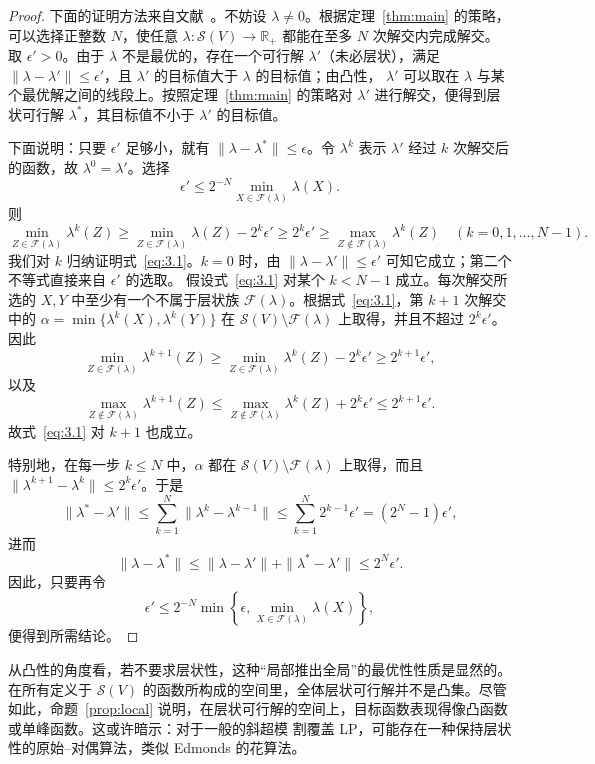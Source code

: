 \documentclass[UTF8,11pt,a4paper]{ctexart}
\numberwithin{equation}{section}
\newcommand{\calS}{\mathcal S}
\newcommand{\calF}{\mathcal F}
\newcommand{\R}{\mathbb R}
\begin{document}
\begin{proof}
下面的证明方法来自文献~\cite{HiraiPap}。不妨设 $\lambda\ne0$。根据定理~\ref{thm:main}
的策略，可以选择正整数 $N$，使任意 $\lambda:\calS(V)\to\R_+$ 都能在至多 $N$ 次解交内完成解交。
取 $\epsilon'>0$。由于 $\lambda$ 不是最优的，存在一个可行解 $\lambda'$（未必层状），满足
$\|\lambda-\lambda'\|\le\epsilon'$，且 $\lambda'$ 的目标值大于 $\lambda$ 的目标值；由凸性，
$\lambda'$ 可以取在 $\lambda$ 与某个最优解之间的线段上。按照定理~\ref{thm:main} 的策略对
$\lambda'$ 进行解交，便得到层状可行解 $\lambda^*$，其目标值不小于 $\lambda'$ 的目标值。

下面说明：只要 $\epsilon'$ 足够小，就有 $\|\lambda-\lambda^*\|\le\epsilon$。令
$\lambda^k$ 表示 $\lambda'$ 经过 $k$ 次解交后的函数，故 $\lambda^0=\lambda'$。选择
\[
\epsilon'\le 2^{-N}\min_{X\in\calF(\lambda)}\lambda(X).
\]
则
\begin{equation}\label{eq:3.1}
\min_{Z\in\calF(\lambda)}\lambda^k(Z)
\ge \min_{Z\in\calF(\lambda)}\lambda(Z)-2^k\epsilon'
\ge 2^k\epsilon'
\ge \max_{Z\notin\calF(\lambda)}\lambda^k(Z)
\quad(k=0,1,\ldots,N-1).
\end{equation}
我们对 $k$ 归纳证明式~\eqref{eq:3.1}。$k=0$ 时，由
$\|\lambda-\lambda'\|\le\epsilon'$ 可知它成立；第二个不等式直接来自 $\epsilon'$ 的选取。
假设式~\eqref{eq:3.1} 对某个 $k<N-1$ 成立。每次解交所选的 $X,Y$ 中至少有一个不属于层状族
$\calF(\lambda)$。根据式~\eqref{eq:3.1}，第 $k+1$ 次解交中的
$\alpha=\min\{\lambda^k(X),\lambda^k(Y)\}$ 在
$\calS(V)\setminus\calF(\lambda)$ 上取得，并且不超过 $2^k\epsilon'$。因此
\[
\min_{Z\in\calF(\lambda)}\lambda^{k+1}(Z)
\ge \min_{Z\in\calF(\lambda)}\lambda^k(Z)-2^k\epsilon'
\ge 2^{k+1}\epsilon',
\]
以及
\[
\max_{Z\notin\calF(\lambda)}\lambda^{k+1}(Z)
\le \max_{Z\notin\calF(\lambda)}\lambda^k(Z)+2^k\epsilon'
\le 2^{k+1}\epsilon'.
\]
故式~\eqref{eq:3.1} 对 $k+1$ 也成立。

特别地，在每一步 $k\le N$ 中，$\alpha$ 都在
$\calS(V)\setminus\calF(\lambda)$ 上取得，而且
$\|\lambda^{k+1}-\lambda^k\|\le2^k\epsilon'$。于是
\[
\|\lambda^* -\lambda'\|
\le\sum_{k=1}^{N}\|\lambda^k-\lambda^{k-1}\|
\le\sum_{k=1}^{N}2^{k-1}\epsilon'
=(2^N-1)\epsilon',
\]
进而
\[
\|\lambda-\lambda^*\|
\le\|\lambda-\lambda'\|+\|\lambda^* -\lambda'\|
\le2^N\epsilon'.
\]
因此，只要再令
\[
\epsilon'\le2^{-N}\min\left\{\epsilon,
\min_{X\in\calF(\lambda)}\lambda(X)\right\},
\]
便得到所需结论。
\end{proof}

从凸性的角度看，若不要求层状性，这种“局部推出全局”的最优性性质是显然的。在所有定义于
$\calS(V)$ 的函数所构成的空间里，全体层状可行解并不是凸集。尽管如此，命题~\ref{prop:local}
说明，在层状可行解的空间上，目标函数表现得像凸函数或单峰函数。这或许暗示：对于一般的斜超模
割覆盖 LP，可能存在一种保持层状性的原始--对偶算法，类似 Edmonds 的花算法。
\end{document}
